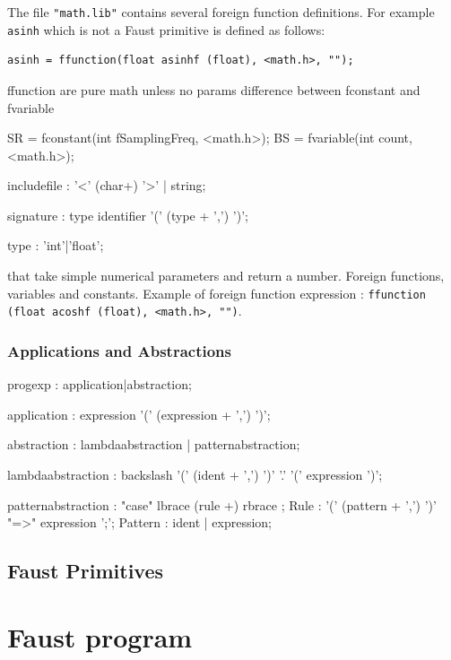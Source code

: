 \documentclass{article}
\begin{document}
The file \lstinline'"math.lib"' contains several foreign function definitions. For example  \lstinline'asinh' which is not a Faust primitive is defined as follows:

\begin{lstlisting}
asinh = ffunction(float asinhf (float), <math.h>, "");
\end{lstlisting}
  
ffunction are pure math unless no params
difference between fconstant and fvariable

SR 			= fconstant(int fSamplingFreq, <math.h>);
BS          = fvariable(int count, <math.h>);

\begin{rail}
includefile : '<' (char+) '>' | string;

signature : type identifier '(' (type + ',') ')';

type : 'int'|'float';
\end{rail}

that take simple numerical parameters and return a number.
Foreign functions, variables and constants. Example of foreign function expression : \lstinline'ffunction (float acoshf (float), <math.h>, "")'.

\subsubsection{Applications and Abstractions}

\begin{rail}
progexp : application|abstraction;

application : expression '(' (expression + ',') ')';

abstraction : lambdaabstraction | patternabstraction; 

lambdaabstraction :  backslash '(' (ident + ',') ')' '.' '(' expression ')';
\end{rail}   

\begin{rail}
patternabstraction :  "case" lbrace (rule +) rbrace ;
Rule : '(' (pattern + ',') ')' "=>" expression ';';
Pattern : ident | expression;
\end{rail}

\subsection{Faust Primitives}



\section{Faust program} 
\end{document}
